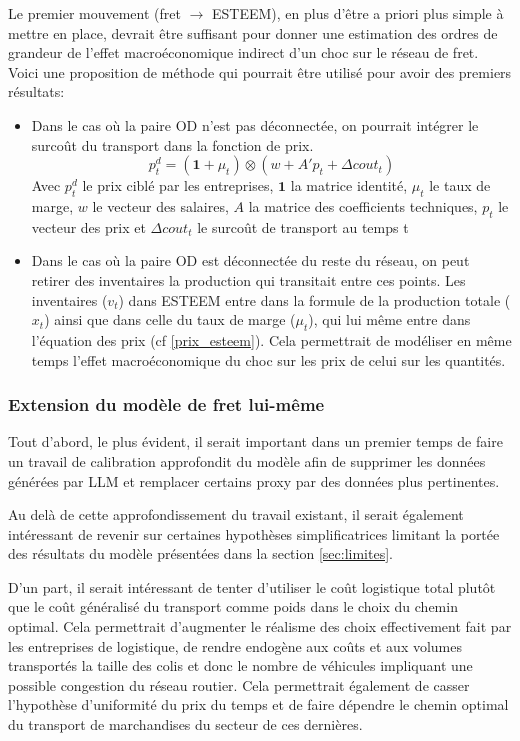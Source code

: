 \documentclass[12pt,a4paper,french]{report}
\begin{document}
	Le premier mouvement (fret $\to$ ESTEEM), en plus d'être a priori plus simple à mettre en place, devrait être suffisant pour donner une estimation des ordres de grandeur de l'effet macroéconomique indirect d'un choc sur le réseau de fret. Voici une proposition de méthode qui pourrait être utilisé pour avoir des premiers résultats: 
	\begin{itemize}
		\item Dans le cas où la paire OD n'est pas déconnectée, on pourrait intégrer le surcoût du transport dans la fonction de prix.
		\begin{equation}
			p_t^d = (\mathbf{1}+\mu_t)\otimes (w+A'p_t+\Delta cout_t)
			\label{prix_esteem}
		\end{equation}
		Avec $p_t^d$ le prix ciblé par les entreprises, $\mathbf{1}$ la matrice identité, $\mu_t$ le taux de marge, $w$ le vecteur des salaires, $A$ la matrice des coefficients techniques, $p_t$ le vecteur des prix et $\Delta cout_t$ le surcoût de transport au temps t
		
		\item Dans le cas où la paire OD est déconnectée du reste du réseau, on peut retirer des inventaires la production qui transitait entre ces points. Les inventaires ($v_t$) dans ESTEEM entre dans la formule de la production totale ($x_t$) ainsi que dans celle du taux de marge ($\mu_t$), qui lui même entre dans l'équation des prix (cf \ref{prix_esteem}). Cela permettrait de modéliser en même temps l'effet macroéconomique du choc sur les prix de celui sur les quantités.
	\end{itemize}
	
	\subsubsection{Extension du modèle de fret lui-même}
	
	Tout d'abord, le plus évident, il serait important dans un premier temps de faire un  travail de calibration approfondit du modèle afin de supprimer les données générées par LLM et remplacer certains proxy par des données plus pertinentes.
	
	\medskip
	
	Au delà de cette approfondissement du travail existant, il serait également intéressant de revenir sur certaines hypothèses simplificatrices limitant la portée des résultats du modèle présentées dans la section \ref{sec:limites}. 
	\medskip
	
	D'un part, il serait intéressant de tenter d'utiliser le coût logistique total plutôt que le coût généralisé du transport comme poids dans le choix du chemin optimal. Cela permettrait d'augmenter le réalisme des choix effectivement fait par les entreprises de logistique, de rendre endogène aux coûts et aux volumes transportés la taille des colis et donc le nombre de véhicules impliquant une possible congestion du réseau routier. Cela permettrait également de casser l'hypothèse d'uniformité du prix du temps et de faire dépendre le chemin optimal du transport de marchandises du secteur de ces dernières.
	
\end{document}
